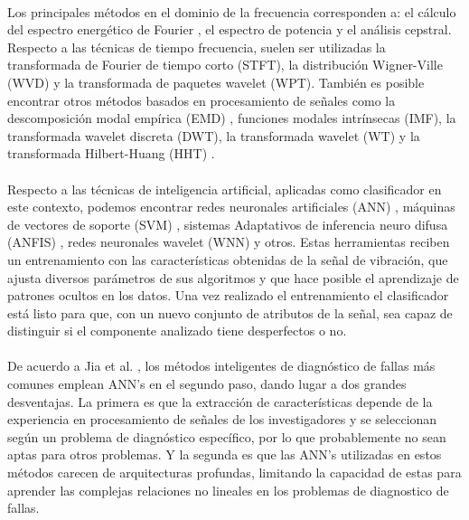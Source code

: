 \documentclass[12pt]{article}%
\begin{document}
\paragraph{}
Los principales métodos en el dominio de la frecuencia corresponden a: el cálculo del espectro energético de Fourier \cite{jia}, el espectro de potencia \cite{li} y el análisis cepstral. Respecto a las  técnicas de tiempo frecuencia, suelen ser utilizadas la transformada de Fourier de tiempo corto (STFT), la distribución Wigner-Ville (WVD) y la transformada de paquetes wavelet (WPT). También es posible encontrar otros métodos basados en procesamiento de señales como la descomposición modal empírica (EMD) \cite{yu}, funciones modales intrínsecas (IMF), la transformada wavelet discreta (DWT), la transformada wavelet (WT) \cite{chang} y la transformada Hilbert-Huang (HHT) \cite{rai}.

\paragraph{}
Respecto a las técnicas de inteligencia artificial, aplicadas como clasificador en este contexto, podemos encontrar redes neuronales artificiales (ANN) \cite{ali}, máquinas de vectores de soporte (SVM) \cite{konar}, sistemas Adaptativos de inferencia neuro difusa (ANFIS) \cite{issam}, redes neuronales wavelet (WNN) \cite{wu} y otros. Estas herramientas reciben un entrenamiento con las características obtenidas de la señal de vibración, que ajusta diversos parámetros de sus algoritmos y que hace posible el aprendizaje de patrones ocultos en los datos. Una vez realizado el entrenamiento el clasificador está listo para que, con un nuevo conjunto de atributos de la señal, sea capaz de distinguir si el componente analizado tiene desperfectos o no.

\paragraph{}
De acuerdo a Jia et al. \cite{jia}, los métodos inteligentes de diagnóstico de fallas más comunes emplean ANN's en el segundo paso, dando lugar a dos grandes desventajas. La primera es que la extracción de características depende de la experiencia en procesamiento de señales de los investigadores y se seleccionan según un problema de diagnóstico específico, por lo que probablemente no sean aptas para otros problemas. Y la segunda es que las ANN's utilizadas en estos métodos carecen de arquitecturas profundas, limitando la capacidad de estas para aprender las complejas relaciones no lineales en los problemas de diagnostico de fallas.
\end{document}
